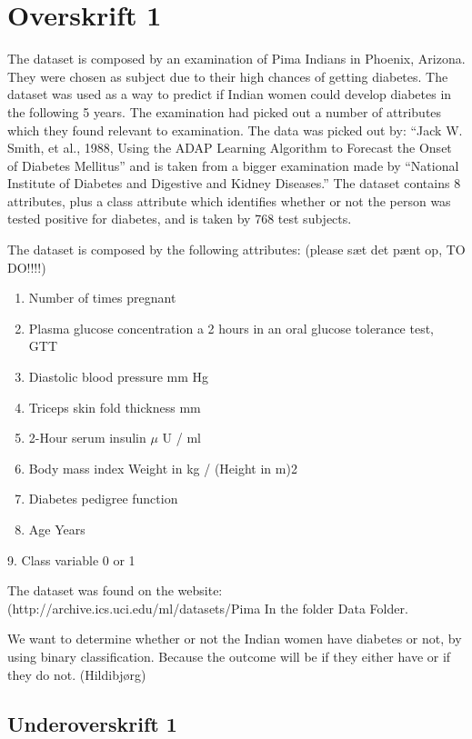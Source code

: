 \section{Overskrift 1}

The dataset is composed by an examination of Pima Indians in Phoenix, Arizona.
They were chosen as subject due to their high chances of getting diabetes. The dataset was used as a way to predict if Indian women could develop diabetes in the following 5 years. The examination had picked out a number of attributes which they found relevant to examination.
The data was picked out by: “Jack W. Smith, et al., 1988, Using the ADAP Learning Algorithm to Forecast the Onset of Diabetes Mellitus” and is taken from a bigger examination made by “National Institute of Diabetes and Digestive and Kidney Diseases.”
The dataset contains 8 attributes, plus a class attribute which identifies whether or not the person was tested positive for diabetes, and is taken by 768 test subjects.

The dataset is composed by the following attributes:
(please sæt det pænt op, TO DO!!!!)
\begin{enumerate}
\item Number of times pregnant
\item Plasma glucose concentration a 2 hours in an oral glucose tolerance test, GTT
\item Diastolic blood pressure mm Hg
\item Triceps skin fold thickness mm
\item 2-Hour serum insulin $\mu$ U / ml
\item Body mass index Weight in kg / (Height in m)2
\item Diabetes pedigree function
\item Age Years
\end{enumerate}

 9. Class variable 0 or 1

The dataset was found on the website:
(http://archive.ics.uci.edu/ml/datasets/Pima%
In the folder Data Folder.

We want to determine whether or not the Indian women have diabetes or not, by using binary classification. Because the outcome will be if they either have or if they do not.
(Hildibjørg)

\subsection{Underoverskrift 1}

